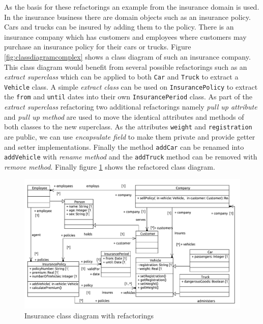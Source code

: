 \documentclass{llncs}
\begin{document}
As the basis for these refactorings an example from the insurance
domain is used. In the insurance business there are domain objects such as an insurance policy. Cars and trucks can be insured by 
adding them to the policy. There is an insurance company which has customers and employees where customers may purchase an insurance policy 
for their cars or trucks. Figure \ref{fig:classdiagramcomplex} shows a class diagram of such an insurance company. This class 
diagram would benefit from several possible refactorings such as an \textit{extract superclass} which can be applied to both \lstinline|Car| 
and \lstinline|Truck| to extract a \lstinline|Vehicle| class. A simple \textit{extract class} can be used on \lstinline|InsurancePolicy| to 
extract the \lstinline|from| and \lstinline|until| dates into their own \lstinline|InsurancePeriod| class. As part of the 
\textit{extract superclass} refactoring two additional refactorings namely \textit{pull up attribute} and \textit{pull up method} are 
used to move the identical attributes and methods of both classes to the new superclass. As the 
attributes \lstinline|weight| and \lstinline|registration| are public, we can use \textit{encapsulate field} to make them private and 
provide getter and setter implementations. Finally the method \lstinline|addCar| can be renamed into \lstinline|addVehicle| with \textit{rename method} 
and the \lstinline|addTruck| method can be removed with \textit{remove method}. Finally figure \ref{fig:classdiagramcomplexRef} shows 
the refactored class diagram.

\begin{figure}[h!t]
 \centering
 \includegraphics[scale=0.5]{images/insurance_ref/Model_Model_ClassDiagram}
 \caption{Insurance class diagram with refactorings}
 \label{fig:classdiagramcomplexRef}
\end{figure}
\end{document}
